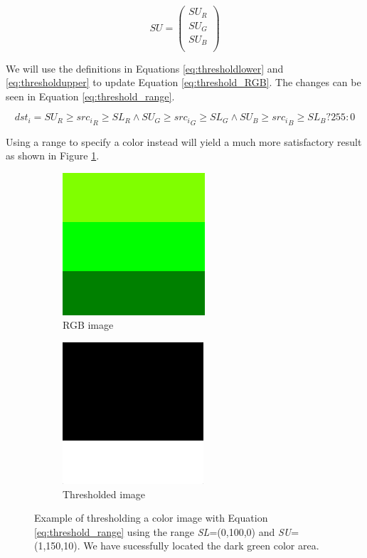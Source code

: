 \begin{equation}
SU =  
\begin{pmatrix}
  SU_{R}\\
  SU_{G}\\
  SU_{B}\\
\end{pmatrix}
\label{eq:thresholdupper}
\end{equation}

We will use the definitions in Equations \ref{eq:thresholdlower} and \ref{eq:thresholdupper} to update Equation \ref{eq:threshold_RGB}. The changes can be seen in Equation \ref{eq:threshold_range}.

\begin{equation}
{dst_i} = SU_R \geq {src_i}_R \geq SL_R \wedge SU_G \geq {src_i}_G \geq SL_G \wedge SU_B \geq {src_i}_B \geq SL_B? 255: 0
\label{eq:threshold_range}
\end{equation}

Using a range to specify a color instead will yield a much more satisfactory result as shown in Figure \ref{fig:green_final}. \\

\begin{figure}
        \centering
        \begin{subfigure}[b]{0.3\textwidth}
                \includegraphics[scale=0.5]{img/green}
                \caption{RGB image}
        \end{subfigure}
		\quad
        \begin{subfigure}[b]{0.3\textwidth}
                \includegraphics[scale=0.5]{img/finalthresh}
                \caption{Thresholded image}
        \end{subfigure}
		\caption{Example of thresholding a color image with Equation \ref{eq:threshold_range} using the range \textit{SL}=(0,100,0) and \textit{SU}=(1,150,10). We have sucessfully located the dark green color area.}
		\label{fig:green_final}
\end{figure}

